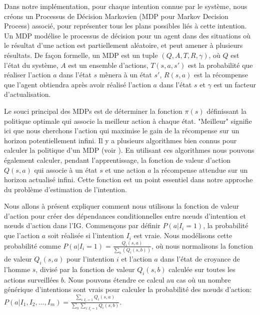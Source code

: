 \documentclass[a4paper,11pt,twoside]{StyleThese}
\begin{document}
Dans notre implémentation, pour chaque intention connue par le système, nous créons un Processus de Décision Markovien (MDP pour Markov Decision Process) associé, pour représenter tous les plans possibles liés à cette intention. Un MDP modélise le processus de décision pour un agent dans des situations où le résultat d'une action est partiellement aléatoire, et peut amener à plusieurs résultats. De façon formelle, un MDP est un tuple  \((Q,A,T,R,\gamma)\), où $Q$ est l'état du système, $A$ est un ensemble d'actions, $T(s,a,s')$ est la probabilité que réaliser l'action $a$ dans l'état $s$ mènera à un état $s'$, $R(s,a)$ est la récompense que l'agent obtiendra après avoir réalisé l'action $a$ dans l'état $s$ et \(\gamma\) est un facteur d'actualisation.


Le souci principal des MDPs est de déterminer la fonction \(\pi(s)\) définissant la politique optimale qui associe la meilleur action à chaque état. "Meilleur" signifie ici que nous cherchons l'action qui maximise le gain de la récompense sur un horizon potentiellement infini. Il y a plusieurs algorithmes bien connus pour calculer la politique d'un MDP (voir \cite{2012Mausam}). En utilisant ces algorithmes nous pouvons également calculer, pendant l'apprentissage, la fonction de valeur d'action \(Q(s,a)\) qui associe à un état $s$ et une action $a$ la récompense attendue sur un horizon actualisé infini. Cette fonction est un point essentiel dans notre approche du problème d'estimation de l'intention.



Nous allons à présent expliquer comment nous utilisons la fonction de valeur d'action pour créer des dépendances conditionnelles entre nœuds d'intention et nœuds d'action dans l'IG. Commençons par définir \(P(a|I_i=1)\), la probabilité que l'action $a$ soit réalisée si l'intention $I_i$ est vraie. Nous modélisons cette probabilité comme \(P(a|I_i=1)=\frac{Q_i(s,a)}{\sum_b(Q_i(s,b))}\), où nous normalisons la fonction de valeur $Q_i(s,a)$ pour l'intention $i$ et l'action $a$ dans l'état de croyance de l'homme $s$, divisé par la fonction de valeur $Q_i(s,b)$ calculée sur toutes les actions surveillées $b$. Nous pouvons étendre ce calcul au cas où un nombre générique d'intentions sont vrais pour calculer la probabilité des nœuds d'action: \(P(a|I_1,I_2,...,I_m)=\frac{\sum_{i:I_i=1}Q_i(s,a)}{\sum_b\sum_{i:I_i=1}Q_i(s,b)}\).
\end{document}
